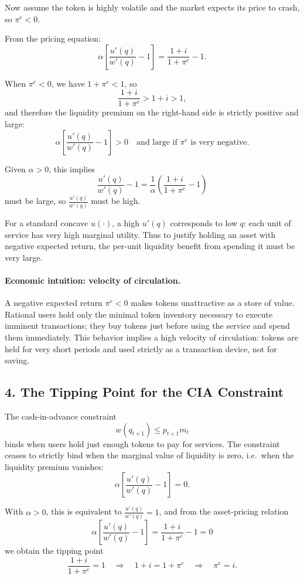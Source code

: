 \documentclass[11pt, a4paper]{article}
\begin{document}
Now assume the token is highly volatile and the market expects its price to crash, so \(\pi^e < 0\).  

From the pricing equation:
\[
\alpha\left[\frac{u'(q)}{w'(q)} - 1\right]
= \frac{1+i}{1+\pi^e} - 1.
\]

When \(\pi^e < 0\), we have \(1 + \pi^e < 1\), so
\[
\frac{1+i}{1+\pi^e} > 1+i > 1,
\]
and therefore the liquidity premium on the right-hand side is strictly positive and large:
\[
\alpha\left[\frac{u'(q)}{w'(q)} - 1\right] > 0 \quad \text{and large if } \pi^e \text{ is very negative.}
\]

Given \(\alpha>0\), this implies
\[
\frac{u'(q)}{w'(q)} - 1
= \frac{1}{\alpha}
\left(
\frac{1+i}{1+\pi^e} - 1
\right)
\]
must be large, so \(\frac{u'(q)}{w'(q)}\) must be high.  

For a standard concave \(u(\cdot)\), a high \(u'(q)\) corresponds to low \(q\): each unit of service has very high marginal utility.  
Thus to justify holding an asset with negative expected return, the per-unit liquidity benefit from spending it must be very large.

\paragraph{Economic intuition: velocity of circulation.}

A negative expected return \(\pi^e<0\) makes tokens unattractive as a store of value.  
Rational users hold only the minimal token inventory necessary to execute imminent transactions; they buy tokens just before using the service and spend them immediately.  
This behavior implies a high velocity of circulation: tokens are held for very short periods and used strictly as a transaction device, not for saving.

\subsection*{4. The Tipping Point for the CIA Constraint}

The cash-in-advance constraint
\[
w(q_{t+1}) \le p_{t+1} m_t
\]
binds when users hold just enough tokens to pay for services.  
The constraint ceases to strictly bind when the marginal value of liquidity is zero, i.e.\ when the liquidity premium vanishes:
\[
\alpha\left[\frac{u'(q)}{w'(q)} - 1\right] = 0.
\]

With \(\alpha>0\), this is equivalent to \(\frac{u'(q)}{w'(q)} = 1\), and from the asset-pricing relation
\[
\alpha\left[\frac{u'(q)}{w'(q)} - 1\right]
= \frac{1+i}{1+\pi^e} - 1 = 0
\]
we obtain the tipping point
\[
\frac{1+i}{1+\pi^e} = 1
\quad\Longrightarrow\quad
1+i = 1+\pi^e
\quad\Longrightarrow\quad
\pi^e = i.
\]
\end{document}
